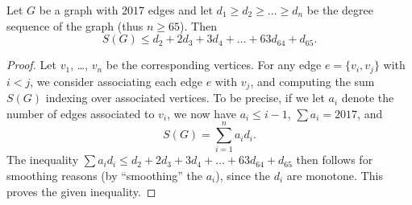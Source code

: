 \documentclass[11pt]{scrartcl}
\begin{document}
\begin{lemma*}
  Let $G$ be a graph with $2017$ edges and let
  $d_1 \ge d_2 \ge \dots \ge d_n$ be the degree sequence of the graph
  (thus $n \ge 65$).
  Then \[ S(G) \le d_2 + 2d_3 + 3d_4 + \dots + 63d_{64} + d_{65}. \]
\end{lemma*}
\begin{proof}
  Let $v_1$, \dots, $v_n$ be the corresponding vertices.
  For any edge $e = \{v_i, v_j\}$ with $i < j$,
  we consider associating each edge $e$ with $v_j$,
  and computing the sum $S(G)$ indexing over associated vertices.
  To be precise, if we let $a_i$ denote the number of edges
  associated to $v_i$, we now have $a_i \le i-1$, $\sum a_i = 2017$, and
  \[ S(G) = \sum_{i=1}^n a_i d_i. \]
  The inequality
  $\sum a_i d_i \le d_2 + 2d_3 + 3d_4 + \dots + 63d_{64} + d_{65}$
  then follows for smoothing reasons
  (by ``smoothing'' the $a_i$), since the $d_i$ are monotone.
  This proves the given inequality.
\end{proof}
\end{document}

